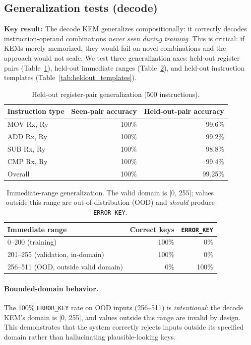 \documentclass[11pt]{article}
\begin{document}
\subsection{Generalization tests (decode)}
\textbf{Key result:} The decode KEM generalizes compositionally: it correctly decodes instruction-operand combinations \emph{never seen during training}.
This is critical: if KEMs merely memorized, they would fail on novel combinations and the approach would not scale.
We test three generalization axes: held-out register pairs (Table~\ref{tab:heldout_regs}), held-out immediate ranges (Table~\ref{tab:imm_ranges}), and held-out instruction templates (Table~\ref{tab:heldout_templates}).

\begin{table}[h]
\centering
\caption{Held-out register-pair generalization (500 instructions).}
\label{tab:heldout_regs}
\begin{tabular}{lrr}
\toprule
Instruction type & Seen-pair accuracy & Held-out-pair accuracy \\
\midrule
MOV Rx, Ry & 100\% & 99.6\% \\
ADD Rx, Ry & 100\% & 99.2\% \\
SUB Rx, Ry & 100\% & 98.8\% \\
CMP Rx, Ry & 100\% & 99.4\% \\
\midrule
Overall & 100\% & 99.25\% \\
\bottomrule
\end{tabular}
\end{table}

\begin{table}[h]
\centering
\caption{Immediate-range generalization. The valid domain is [0, 255]; values outside this range are out-of-distribution (OOD) and \emph{should} produce \texttt{ERROR\_KEY}.}
\label{tab:imm_ranges}
\begin{tabular}{lrr}
\toprule
Immediate range & Correct keys & \texttt{ERROR\_KEY} \\
\midrule
0--200 (training) & 100\% & 0\% \\
201--255 (validation, in-domain) & 100\% & 0\% \\
256--511 (OOD, outside valid domain) & 0\% & 100\% \\
\bottomrule
\end{tabular}
\end{table}

\paragraph{Bounded-domain behavior.}
The 100\% \texttt{ERROR\_KEY} rate on OOD inputs (256--511) is \emph{intentional}: the decode KEM's domain is [0, 255], and values outside this range are invalid by design. This demonstrates that the system correctly rejects inputs outside its specified domain rather than hallucinating plausible-looking keys.
\end{document}
